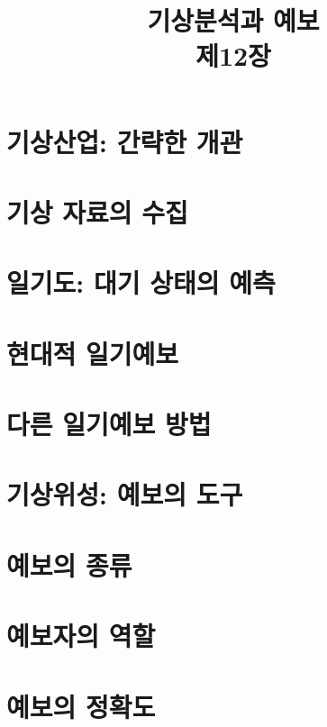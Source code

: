 \title[]{기상분석과 예보\\\small{제12장}}

\begin{frame}[plain] %
	\titlepage
\end{frame}


\section{기상산업: 간략한 개관}


\section{기상 자료의 수집}

\section{일기도: 대기 상태의 예측}

\section{현대적 일기예보}

\section{다른 일기예보 방법}

\section{기상위성: 예보의 도구}

\section{예보의 종류}

\section{예보자의 역할}

\section{예보의 정확도}


